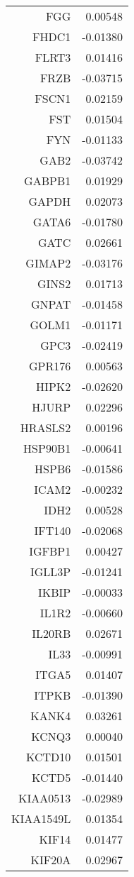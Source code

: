 \begin{longtable}{rr}
  FGG & 0.00548 \\ 
  FHDC1 & -0.01380 \\ 
  FLRT3 & 0.01416 \\ 
  FRZB & -0.03715 \\ 
  FSCN1 & 0.02159 \\ 
  FST & 0.01504 \\ 
  FYN & -0.01133 \\ 
  GAB2 & -0.03742 \\ 
  GABPB1 & 0.01929 \\ 
  GAPDH & 0.02073 \\ 
  GATA6 & -0.01780 \\ 
  GATC & 0.02661 \\ 
  GIMAP2 & -0.03176 \\ 
  GINS2 & 0.01713 \\ 
  GNPAT & -0.01458 \\ 
  GOLM1 & -0.01171 \\ 
  GPC3 & -0.02419 \\ 
  GPR176 & 0.00563 \\ 
  HIPK2 & -0.02620 \\ 
  HJURP & 0.02296 \\ 
  HRASLS2 & 0.00196 \\ 
  HSP90B1 & -0.00641 \\ 
  HSPB6 & -0.01586 \\ 
  ICAM2 & -0.00232 \\ 
  IDH2 & 0.00528 \\ 
  IFT140 & -0.02068 \\ 
  IGFBP1 & 0.00427 \\ 
  IGLL3P & -0.01241 \\ 
  IKBIP & -0.00033 \\ 
  IL1R2 & -0.00660 \\ 
  IL20RB & 0.02671 \\ 
  IL33 & -0.00991 \\ 
  ITGA5 & 0.01407 \\ 
  ITPKB & -0.01390 \\ 
  KANK4 & 0.03261 \\ 
  KCNQ3 & 0.00040 \\ 
  KCTD10 & 0.01501 \\ 
  KCTD5 & -0.01440 \\ 
  KIAA0513 & -0.02989 \\ 
  KIAA1549L & 0.01354 \\ 
  KIF14 & 0.01477 \\ 
  KIF20A & 0.02967 \\ 

\end{longtable}
